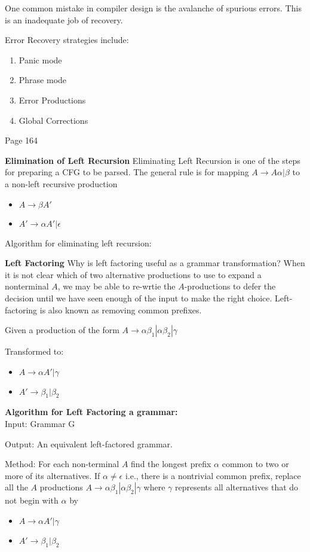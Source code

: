 \documentclass[11pt]{article}
\begin{document}
 One common mistake in compiler design is the avalanche of spurious errors.  This is an inadequate job of recovery.  
 
 Error Recovery strategies include:
 \begin{enumerate}
\item Panic mode 
\item Phrase mode
\item Error Productions
\item Global Corrections
\end{enumerate}
Page 164


\textbf {\Large Elimination of Left Recursion}
Eliminating Left Recursion is one of the steps for preparing a CFG to be parsed.  The general rule is for mapping  $A\to A\alpha | \beta$ to a non-left recursive production
\begin{itemize}
\item $A \to \beta A'$
\item $A' \to \alpha A' | \epsilon $
\end{itemize}

Algorithm for eliminating left recursion:


\textbf {\Large Left Factoring}
Why is left factoring useful as a grammar transformation?  When it is not clear which of two alternative productions to use to expand a nonterminal $A$, we may be able to re-wrtie the $A$-productions to defer the decision until we have seen enough of the input to make the right choice.  Left-factoring is also known as removing common prefixes.  

Given a production of the form $A\to \alpha \beta _1 | \alpha \beta _2 | \gamma$

Transformed to:
\begin{itemize}
\item $A \to \alpha A' | \gamma$
\item $A' \to \beta _1 | \beta _2$
\end{itemize}

\textbf{Algorithm for Left Factoring a grammar:} \\

Input: Grammar G

Output: An equivalent left-factored grammar.

Method: For each non-terminal $A$ find the longest prefix $\alpha$ common to two or more of its alternatives.  If $\alpha \neq \epsilon$ i.e., there is a nontrivial common prefix, replace all the $A$ productions $A\to \alpha \beta _1 | \alpha \beta _2 | \gamma$ where $\gamma$ represents all alternatives that do not begin with $\alpha$ by 
\begin{itemize}
\item $A \to \alpha A' | \gamma$
\item $A' \to \beta _1 | \beta _2$
\end{itemize}
\end{document}
